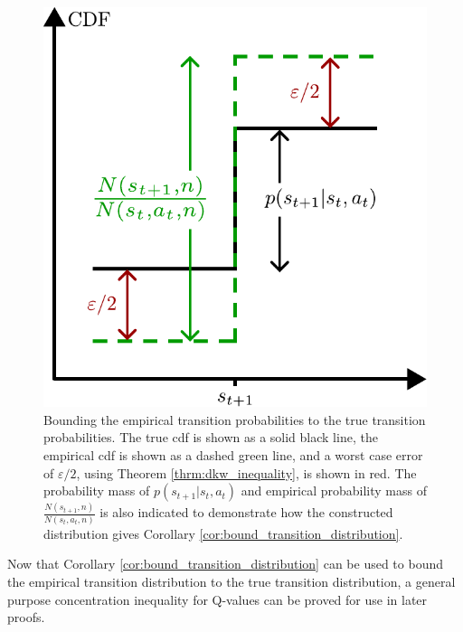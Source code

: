     
    \begin{figure}
        \centering
        \includegraphics[scale=0.6]{figures/ch4/dkw_diagram.pdf}
        \caption[Bounding the empirical transition probabilities to the true transition probabilities.]{Bounding the empirical transition probabilities to the true transition probabilities. The true cdf is shown as a solid black line, the empirical cdf is shown as a dashed green line, and a worst case error of $\varepsilon/2$, using Theorem \ref{thrm:dkw_inequality}, is shown in red. The probability mass of $p(s_{t+1}|s_t,a_t)$ and empirical probability mass of $\frac{N(s_{t+1},n)}{N(s_t,a_t,n)}$ is also indicated to demonstrate how the constructed distribution gives Corollary \ref{cor:bound_transition_distribution}.}
        \label{fig:dkw_diag}
    \end{figure}







        


    Now that Corollary \ref{cor:bound_transition_distribution} can be used to bound  the empirical transition distribution to the true transition distribution,  a general purpose concentration inequality for Q-values can be proved for use in later proofs.
    
